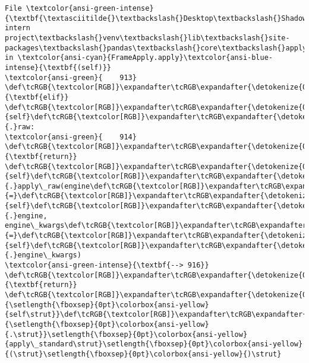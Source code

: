 \documentclass[11pt]{article}
\begin{document}
\begin{Verbatim}[commandchars=\\\{\}, frame=single, framerule=2mm, rulecolor=\color{outerrorbackground}]
File \textcolor{ansi-green-intense}{\textbf{\textasciitilde{}\textbackslash{}Desktop\textbackslash{}Shadowfox intern project\textbackslash{}venv\textbackslash{}lib\textbackslash{}site-packages\textbackslash{}pandas\textbackslash{}core\textbackslash{}apply.py:916}}, in \textcolor{ansi-cyan}{FrameApply.apply}\textcolor{ansi-blue-intense}{\textbf{(self)}}
\textcolor{ansi-green}{    913} \def\tcRGB{\textcolor[RGB]}\expandafter\tcRGB\expandafter{\detokenize{0,135,0}}{\textbf{elif}} \def\tcRGB{\textcolor[RGB]}\expandafter\tcRGB\expandafter{\detokenize{0,135,0}}{self}\def\tcRGB{\textcolor[RGB]}\expandafter\tcRGB\expandafter{\detokenize{98,98,98}}{.}raw:
\textcolor{ansi-green}{    914}     \def\tcRGB{\textcolor[RGB]}\expandafter\tcRGB\expandafter{\detokenize{0,135,0}}{\textbf{return}} \def\tcRGB{\textcolor[RGB]}\expandafter\tcRGB\expandafter{\detokenize{0,135,0}}{self}\def\tcRGB{\textcolor[RGB]}\expandafter\tcRGB\expandafter{\detokenize{98,98,98}}{.}apply\_raw(engine\def\tcRGB{\textcolor[RGB]}\expandafter\tcRGB\expandafter{\detokenize{98,98,98}}{=}\def\tcRGB{\textcolor[RGB]}\expandafter\tcRGB\expandafter{\detokenize{0,135,0}}{self}\def\tcRGB{\textcolor[RGB]}\expandafter\tcRGB\expandafter{\detokenize{98,98,98}}{.}engine, engine\_kwargs\def\tcRGB{\textcolor[RGB]}\expandafter\tcRGB\expandafter{\detokenize{98,98,98}}{=}\def\tcRGB{\textcolor[RGB]}\expandafter\tcRGB\expandafter{\detokenize{0,135,0}}{self}\def\tcRGB{\textcolor[RGB]}\expandafter\tcRGB\expandafter{\detokenize{98,98,98}}{.}engine\_kwargs)
\textcolor{ansi-green-intense}{\textbf{--> 916}} \def\tcRGB{\textcolor[RGB]}\expandafter\tcRGB\expandafter{\detokenize{0,135,0}}{\textbf{return}} \def\tcRGB{\textcolor[RGB]}\expandafter\tcRGB\expandafter{\detokenize{0,135,0}}{\setlength{\fboxsep}{0pt}\colorbox{ansi-yellow}{self\strut}}\def\tcRGB{\textcolor[RGB]}\expandafter\tcRGB\expandafter{\detokenize{98,98,98}}{\setlength{\fboxsep}{0pt}\colorbox{ansi-yellow}{.\strut}}\setlength{\fboxsep}{0pt}\colorbox{ansi-yellow}{apply\_standard\strut}\setlength{\fboxsep}{0pt}\colorbox{ansi-yellow}{(\strut}\setlength{\fboxsep}{0pt}\colorbox{ansi-yellow}{)\strut}


\end{Verbatim}
\end{document}
